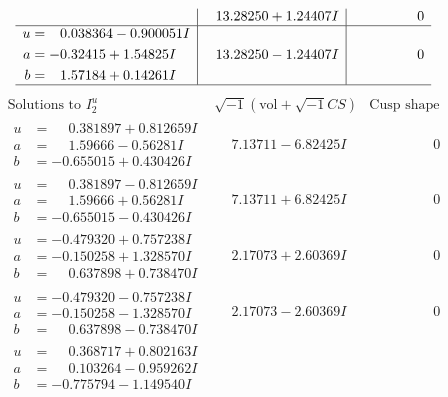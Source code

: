 \documentclass[1p]{elsarticle_modified}
\theoremstyle{definition}
\newcommand{\I}{\sqrt{-1}}
\begin{document}
$$\begin{array}{c|c|c}
 & \phantom{-}13.28250 + 1.24407 I & \phantom{-0.000000 } 0 \\ \hline\begin{aligned}
u &= \phantom{-}0.038364 - 0.900051 I \\
a &= -0.32415 + 1.54825 I \\
b &= \phantom{-}1.57184 + 0.14261 I\end{aligned}
 & \phantom{-}13.28250 - 1.24407 I & \phantom{-0.000000 } 0\\
 \hline 
 \end{array}$$\newpage$$\begin{array}{c|c|c}  
\text{Solutions to }I^u_{2}& \I (\text{vol} + \sqrt{-1}CS) & \text{Cusp shape}\\
 \hline 
\begin{aligned}
u &= \phantom{-}0.381897 + 0.812659 I \\
a &= \phantom{-}1.59666 - 0.56281 I \\
b &= -0.655015 + 0.430426 I\end{aligned}
 & \phantom{-}7.13711 - 6.82425 I & \phantom{-0.000000 } 0 \\ \hline\begin{aligned}
u &= \phantom{-}0.381897 - 0.812659 I \\
a &= \phantom{-}1.59666 + 0.56281 I \\
b &= -0.655015 - 0.430426 I\end{aligned}
 & \phantom{-}7.13711 + 6.82425 I & \phantom{-0.000000 } 0 \\ \hline\begin{aligned}
u &= -0.479320 + 0.757238 I \\
a &= -0.150258 + 1.328570 I \\
b &= \phantom{-}0.637898 + 0.738470 I\end{aligned}
 & \phantom{-}2.17073 + 2.60369 I & \phantom{-0.000000 } 0 \\ \hline\begin{aligned}
u &= -0.479320 - 0.757238 I \\
a &= -0.150258 - 1.328570 I \\
b &= \phantom{-}0.637898 - 0.738470 I\end{aligned}
 & \phantom{-}2.17073 - 2.60369 I & \phantom{-0.000000 } 0 \\ \hline\begin{aligned}
u &= \phantom{-}0.368717 + 0.802163 I \\
a &= \phantom{-}0.103264 - 0.959262 I \\
b &= -0.775794 - 1.149540 I\end{aligned}

\end{array}$$
\end{document}
